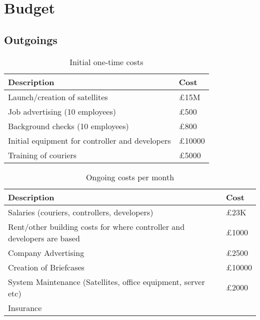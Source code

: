 \section{Budget}

\subsection{Outgoings}

\begin{table}[H]
    \centering
    \begin{tabular}{|p{}|p{}|}
        \hline
        
        \textbf{Description} & \textbf{Cost} \\
        \hline
        Launch/creation of satellites & £15M \\
        \hline
        Job advertising (10 employees) & £500\\
        \hline
        Background checks (10 employees) & £800 \\
        \hline
        Initial equipment for controller and developers & £10000\\
        \hline
        Training of couriers & £5000\\
        \hline
    \end{tabular}
    \caption{Initial one-time costs}
    \label{tab:initialCosts}
\end{table}

\begin{table}[H]
    \centering
    \begin{tabular}{|p{}|p{}|}
        \hline
        \textbf{Description} & \textbf{Cost} \\
        \hline
        Salaries (couriers, controllers, developers) & £23K\\
        \hline
        Rent/other building costs for where controller and developers are based & £1000\\
        \hline
        Company Advertising & £2500\\
        \hline
        Creation of Briefcases & £10000\\
        \hline
        System Maintenance (Satellites, office equipment, server etc) & £2000\\
        \hline
        Insurance & \\
        \hline
    \end{tabular}
    \caption{Ongoing costs per month}
    \label{tab:ongoingCosts}
\end{table}

